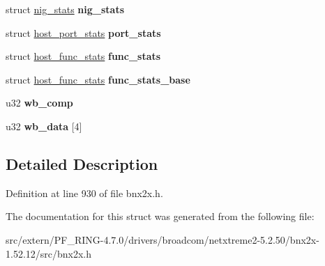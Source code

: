 \begin{DoxyCompactItemize}
\item 
\hypertarget{structbnx2x__slowpath_abe3915f2a65ee2ee7675f37427b9c277}{
struct \hyperlink{structnig__stats}{nig\_\-stats} {\bfseries nig\_\-stats}}
\label{structbnx2x__slowpath_abe3915f2a65ee2ee7675f37427b9c277}

\item 
\hypertarget{structbnx2x__slowpath_acda378a3d6c24f06f56e8b26857886df}{
struct \hyperlink{structhost__port__stats}{host\_\-port\_\-stats} {\bfseries port\_\-stats}}
\label{structbnx2x__slowpath_acda378a3d6c24f06f56e8b26857886df}

\item 
\hypertarget{structbnx2x__slowpath_a11cd233678eb759ba656277f0c71ca87}{
struct \hyperlink{structhost__func__stats}{host\_\-func\_\-stats} {\bfseries func\_\-stats}}
\label{structbnx2x__slowpath_a11cd233678eb759ba656277f0c71ca87}

\item 
\hypertarget{structbnx2x__slowpath_aa8aeb05e9a2a24e5b4d71957a65b0a48}{
struct \hyperlink{structhost__func__stats}{host\_\-func\_\-stats} {\bfseries func\_\-stats\_\-base}}
\label{structbnx2x__slowpath_aa8aeb05e9a2a24e5b4d71957a65b0a48}

\item 
\hypertarget{structbnx2x__slowpath_a32572e74b748e3b6d75d650543cf059d}{
u32 {\bfseries wb\_\-comp}}
\label{structbnx2x__slowpath_a32572e74b748e3b6d75d650543cf059d}

\item 
\hypertarget{structbnx2x__slowpath_a056dbdd42eddf17cb555f689188e7d72}{
u32 {\bfseries wb\_\-data} \mbox{[}4\mbox{]}}
\label{structbnx2x__slowpath_a056dbdd42eddf17cb555f689188e7d72}

\end{DoxyCompactItemize}


\subsection{Detailed Description}


Definition at line 930 of file bnx2x.h.



The documentation for this struct was generated from the following file:\begin{DoxyCompactItemize}
\item 
src/extern/PF\_\-RING-\/4.7.0/drivers/broadcom/netxtreme2-\/5.2.50/bnx2x-\/1.52.12/src/bnx2x.h\end{DoxyCompactItemize}
